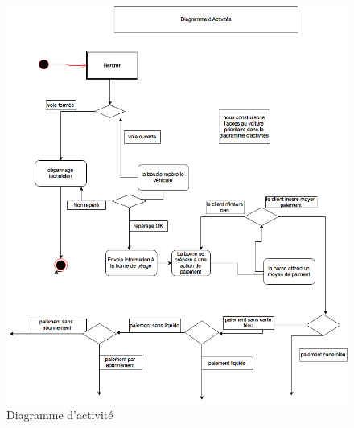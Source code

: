\begin{figure}[h]
    \centering
    \includegraphics[scale=0.45]{02_Desenvolvimento/TD2/images/diagrameAct.png}
    \caption{Diagramme d'activité}
    \label{fig:my_label}
\end{figure}
